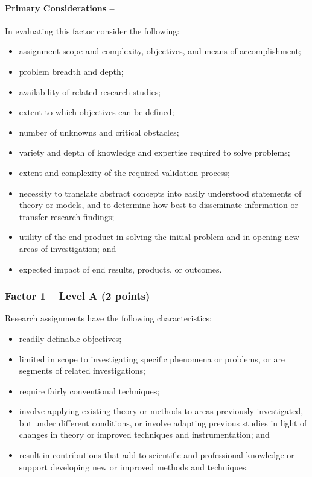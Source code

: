 \paragraph*{\textbf{Primary Considerations --}}
 In evaluating this factor consider the
following:
\begin{itemize}
  \item assignment scope and complexity, objectives, and means of accomplishment;
  \item problem breadth and depth; 
  \item availability of related research studies; 
  \item extent to which objectives can be defined; 
  \item number of unknowns and critical obstacles; 
  \item variety and depth of knowledge and expertise required to solve problems;
  \item extent and complexity of the required validation process; 
  \item necessity to translate abstract concepts into easily understood statements of theory or models, and to determine how best to disseminate information or transfer research findings;
  \item utility of the end product in solving the initial problem and in opening new areas of investigation; and
  \item expected impact of end results, products, or outcomes.
\end{itemize}

\subsubsection*{Factor 1 --  Level A (2 points)}

Research assignments have the following characteristics:
\begin{itemize}
  \item readily definable objectives; 
  \item limited in scope to investigating specific phenomena or problems, or are segments of related investigations; 
  \item require fairly conventional techniques; 
  \item involve applying existing theory or methods to areas previously investigated, but under different conditions, or involve adapting previous studies in light of changes in theory or improved techniques and instrumentation; and
  \item result in contributions that add to scientific and professional knowledge or support developing new or improved methods and techniques. 
\end{itemize}

